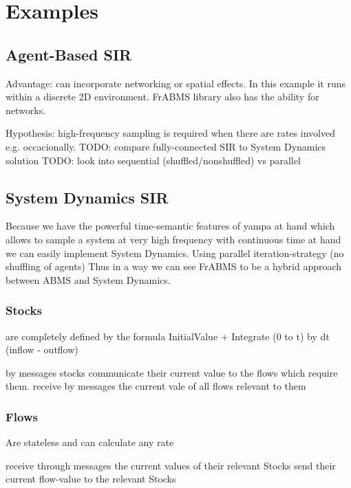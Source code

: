 \section{Examples}

\subsection{Agent-Based SIR}
Advantage: can incorporate networking or spatial effects. In this example it runs within a discrete 2D environment. FrABMS library also has the ability for networks.

Hypothesis: high-frequency sampling is required when there are rates involved e.g. occacionally.
TODO: compare fully-connected SIR to System Dynamics solution
TODO: look into sequential (shuffled/nonshuffled) vs parallel

\subsection{System Dynamics SIR}
Because we have the powerful time-semantic features of yampa at hand which allows to sample a system at very high frequency with continuous time at hand we can easily implement System Dynamics.
Using parallel iteration-strategy (no shuffling of agents)
Thus in a way we can see FrABMS to be a hybrid approach between ABMS and System Dynamics.

\subsubsection{Stocks}
are completely defined by the formula
InitialValue + Integrate (0 to t) by dt (inflow - outflow)

by messages stocks communicate their current value to the flows which require them.
receive by messages the current vale of all flows relevant to them

\subsubsection{Flows}
Are stateless and can calculate any rate

receive through messages the current values of their relevant Stocks
send their current flow-value to the relevant Stocks